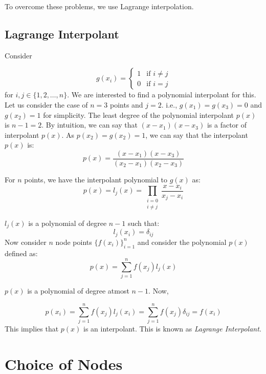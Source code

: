 \documentclass[
]{book}
\begin{document}
To overcome these problems, we use Lagrange interpolation.

\hypertarget{lagrange-interpolant}{%
\subsection{Lagrange Interpolant}\label{lagrange-interpolant}}

Consider

\begin{equation}
g(x_i) = \begin{cases}
        1 & \text{if } i\neq j\\
        0 & \text{if } i=j
    \end{cases}
\end{equation}
for \(i,j \in \{1,2,\dots,n\}\). We are interested to find a polynomial interpolant for this. Let us consider the case of \(n=3\) points and \(j=2\). i.e., \(g(x_1)=g(x_3)=0\) and \(g(x_2)=1\) for simplicity. The least degree of the polynomial interpolant \(p(x)\) is \(n-1=2\). By intuition, we can say that \((x-x_1)(x-x_3)\) is a factor of interpolant \(p(x)\). As \(p(x_2)=g(x_2)=1\), we can say that the interpolant \(p(x)\) is:
\begin{equation}
p(x) = \frac{(x-x_1)(x-x_3)}{(x_2-x_1)(x_2-x_3)}
\end{equation}

For \(n\) points, we have the interpolant polynomial to \(g(x)\) as:
\begin{equation}
p(x) = l_j(x) = \prod_{\substack{i=0 \\ i\neq j}} \frac{x-x_i}{x_j-x_i}
\end{equation}

\(l_j(x)\) is a polynomial of degree \(n-1\) such that:
\[l_j(x_i) = \delta_{ij}\]
Now consider \(n\) node points \(\{f(x_i)\}_{i=1}^n\) and consider the polynomial \(p(x)\) defined as:
\begin{equation}
p(x) = \sum_{j=1}^n f(x_j) l_j(x)
\end{equation}

\(p(x)\) is a polynomial of degree atmost \(n-1\). Now,

\[p(x_i) = \sum_{j=1}^n f(x_j) l_j(x_i) = \sum_{j=1}^n f(x_j) \delta_{ij} = f(x_i)\]
This implies that \(p(x)\) is an interpolant. This is known as \emph{Lagrange Interpolant}.

\hypertarget{choice-of-nodes}{%
\section{Choice of Nodes}\label{choice-of-nodes}}
\end{document}
